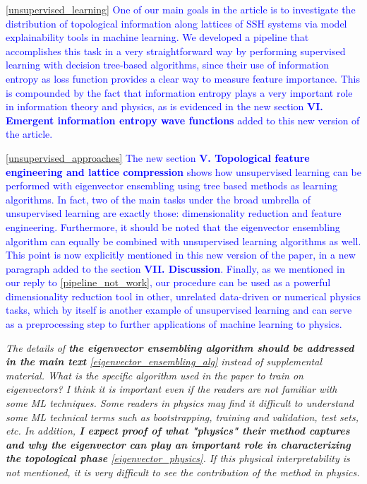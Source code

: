 \documentclass[10pt]{revtex4-1}
\newcounter{quoter}
\newcommand{\genquote}[1]{\refstepcounter{quoter} \label{#1} \ref{#1}}
\newcommand{\citequote}[1]{\ref{#1}}
\begin{document}
\vspace{0.25cm}
\textcolor{blue}{\citequote{unsupervised_learning} One of our main goals in the article is to investigate the distribution of topological information along lattices of SSH systems via model explainability tools in machine learning. We developed a pipeline that accomplishes this task in a very straightforward way by performing supervised learning with decision tree-based algorithms, since their use of information entropy as loss function provides a clear way to measure feature importance. This is compounded by the fact that information entropy plays a very important role in information theory and physics, as is evidenced in the new section \textbf{VI. Emergent information entropy wave functions} added to this new version of the article.}

\textcolor{blue}{\citequote{unsupervised_approaches} The new section \textbf{V. Topological feature engineering and lattice compression} shows how unsupervised learning can be performed with eigenvector ensembling using tree based methods as learning algorithms. In fact, two of the main tasks under the broad umbrella of unsupervised learning are exactly those: dimensionality reduction and feature engineering. Furthermore, it should be noted that the eigenvector ensembling algorithm can equally be combined with unsupervised learning algorithms as well. This point is now explicitly mentioned in this new version of the paper, in a new paragraph added to the section \textbf{VII. Discussion}. Finally, as we mentioned in our reply to \citequote{pipeline_not_work}, our procedure can be used as a powerful dimensionality reduction tool in other, unrelated data-driven or numerical physics tasks, which by itself is another example of unsupervised learning and can serve as a preprocessing step to further applications of machine learning to physics.} 

\vspace{0.5cm}
\emph{The details of \textbf{the eigenvector ensembling algorithm should be addressed in the main text}\genquote{eigenvector_ensembling_alg} instead of supplemental material. What is the specific algorithm used in the paper to train on eigenvectors? I think it is important even if the readers are not familiar with some ML techniques. Some readers in physics may find it difficult to understand some ML technical terms such as bootstrapping, training and validation, test sets, etc. In addition, \textbf{I expect proof of what "physics" their method captures and why the eigenvector can play an important role in characterizing the topological phase}\genquote{eigenvector_physics}. If this physical interpretability is not mentioned, it is very difficult to see the contribution of the method in physics.}
\end{document}
